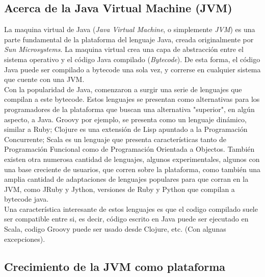 \subsection{Acerca de la Java Virtual Machine (JVM)}
\label{subsec:intro:about_jvm}

La maquina virtual de Java (\emph{Java Virtual Machine}, o simplemente \emph{JVM}) es una
parte fundamental de la plataforma del lenguaje Java, creada originalmente por \emph{Sun
Microsystems}. La maquina virtual crea una capa de abstracción entre el sistema operativo
y el código Java compilado (\emph{Bytecode}). De esta forma, el código Java puede ser
compilado a bytecode una sola vez, y correrse en cualquier sistema que cuente con una
JVM.\\
Con la popularidad de Java, comenzaron a surgir una serie de lenguajes que compilan a este
bytecode. Estos lenguajes se presentan como alternativas para los programadores de
la plataforma que buscan una alternativa "superior", en algún aspecto, a Java. Groovy por
ejemplo, se presenta como un lenguaje dinámico, similar a Ruby; Clojure es una extensión
de Lisp apuntado a la Programación Concurrente; Scala es un lenguaje que presenta
características tanto de Programación Funcional como de Programación Orientada a Objectos.
También existen otra numerosa cantidad de lenguajes, algunos experimentales, algunos con
una base creciente de usuarios, que corren sobre la plataforma, como también una amplia
cantidad de adaptaciones de lenguajes populares para que corran en la JVM, como JRuby y
Jython, versiones de Ruby y Python que compilan a bytecode java.\\
Una característica interesante de estos lenguajes es que el codigo compilado suele ser
compatible entre si, es decir, código escrito en Java puede ser ejecutado en Scala,
codigo Groovy puede ser usado desde Clojure, etc. (Con algunas excepciones).\\



\subsection{Crecimiento de la JVM como plataforma}
\label{subsec:intro:jvm_growth}

